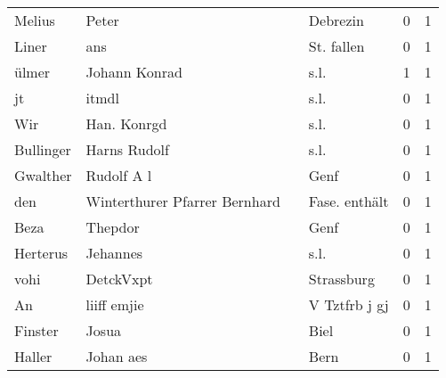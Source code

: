 \begin{tabular}{llllrr}
                   Melius &                              Peter &             &                                    Debrezin &          0 &         1 \\
                    Liner &                                ans &             &                                  St. fallen &          0 &         1 \\
                    ülmer &                      Johann Konrad &             &                                        s.l. &          1 &         1 \\
                       jt &                              itmdl &             &                                        s.l. &          0 &         1 \\
                      Wir &                        Han. Konrgd &             &                                        s.l. &          0 &         1 \\
                Bullinger &                       Harns Rudolf &             &                                        s.l. &          0 &         1 \\
                 Gwalther &                         Rudolf A l &             &                                        Genf &          0 &         1 \\
                      den &      Winterthurer Pfarrer Bernhard &             &                               Fase. enthält &          0 &         1 \\
                     Beza &                            Thepdor &             &                                        Genf &          0 &         1 \\
                 Herterus &                           Jehannes &             &                                        s.l. &          0 &         1 \\
                     vohi &                          DetckVxpt &             &                                  Strassburg &          0 &         1 \\
                       An &                        liiff emjie &             &                               V Tztfrb j gj &          0 &         1 \\
                  Finster &                              Josua &             &                                        Biel &          0 &         1 \\
                   Haller &                          Johan aes &             &                                        Bern &          0 &         1 \\

\end{tabular}
